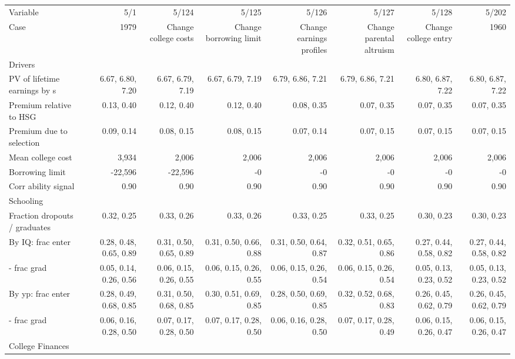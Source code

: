 \begin{tabular}{lrrrrrrr}
\hline
Variable & 5/1  & 5/124  & 5/125  & 5/126  & 5/127  & 5/128  & 5/202  \\ 
Case & 1979  & Change college costs  & Change borrowing limit  & Change earnings profiles  & Change parental altruism  & Change college entry  & 1960  \\ 
Drivers &   &   &   &   &   &   &   \\ 
PV of lifetime earnings by s & 6.67, 6.80, 7.20  & 6.67, 6.79, 7.19  & 6.67, 6.79, 7.19  & 6.79, 6.86, 7.21  & 6.79, 6.86, 7.21  & 6.80, 6.87, 7.22  & 6.80, 6.87, 7.22  \\ 
Premium relative to HSG & 0.13, 0.40  & 0.12, 0.40  & 0.12, 0.40  & 0.08, 0.35  & 0.07, 0.35  & 0.07, 0.35  & 0.07, 0.35  \\ 
Premium due to selection & 0.09, 0.14  & 0.08, 0.15  & 0.08, 0.15  & 0.07, 0.14  & 0.07, 0.15  & 0.07, 0.15  & 0.07, 0.15  \\ 
Mean college cost & 3,934  & 2,006  & 2,006  & 2,006  & 2,006  & 2,006  & 2,006  \\ 
Borrowing limit & -22,596  & -22,596  & -0  & -0  & -0  & -0  & -0  \\ 
Corr ability signal & 0.90  & 0.90  & 0.90  & 0.90  & 0.90  & 0.90  & 0.90  \\ 
\hline
Schooling &   &   &   &   &   &   &   \\ 
Fraction dropouts / graduates & 0.32, 0.25  & 0.33, 0.26  & 0.33, 0.26  & 0.33, 0.25  & 0.33, 0.25  & 0.30, 0.23  & 0.30, 0.23  \\ 
By IQ: frac enter & 0.28, 0.48, 0.65, 0.89  & 0.31, 0.50, 0.65, 0.89  & 0.31, 0.50, 0.66, 0.88  & 0.31, 0.50, 0.64, 0.87  & 0.32, 0.51, 0.65, 0.86  & 0.27, 0.44, 0.58, 0.82  & 0.27, 0.44, 0.58, 0.82  \\ 
- frac grad & 0.05, 0.14, 0.26, 0.56  & 0.06, 0.15, 0.26, 0.55  & 0.06, 0.15, 0.26, 0.55  & 0.06, 0.15, 0.26, 0.54  & 0.06, 0.15, 0.26, 0.54  & 0.05, 0.13, 0.23, 0.52  & 0.05, 0.13, 0.23, 0.52  \\ 
By yp: frac enter & 0.28, 0.49, 0.68, 0.85  & 0.31, 0.50, 0.68, 0.85  & 0.30, 0.51, 0.69, 0.85  & 0.28, 0.50, 0.69, 0.85  & 0.32, 0.52, 0.68, 0.83  & 0.26, 0.45, 0.62, 0.79  & 0.26, 0.45, 0.62, 0.79  \\ 
- frac grad & 0.06, 0.16, 0.28, 0.50  & 0.07, 0.17, 0.28, 0.50  & 0.07, 0.17, 0.28, 0.50  & 0.06, 0.16, 0.28, 0.50  & 0.07, 0.17, 0.28, 0.49  & 0.06, 0.15, 0.26, 0.47  & 0.06, 0.15, 0.26, 0.47  \\ 
\hline
College Finances &   &   &   &   &   &   &   \\ 

\end{tabular}
